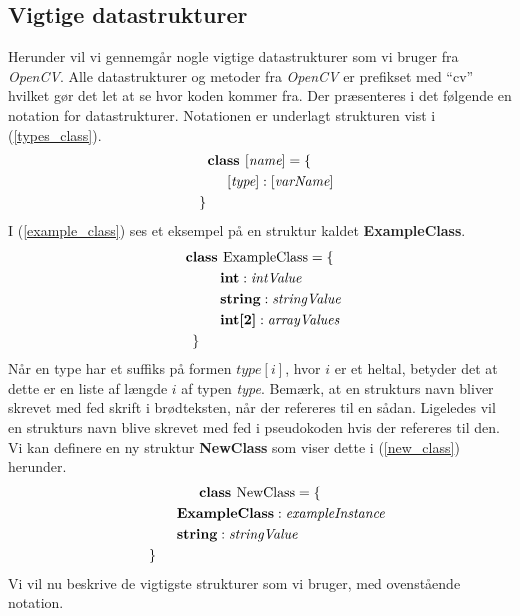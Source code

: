 {\subsection{Vigtige datastrukturer}
Herunder vil vi gennemgår nogle vigtige datastrukturer som vi bruger fra
\emph{OpenCV}.  Alle datastrukturer og metoder fra \emph{OpenCV} er
prefikset med ``cv'' hvilket gør det let at se hvor koden kommer fra.
Der præsenteres i det følgende en notation for datastrukturer.
Notationen er underlagt strukturen vist i (\ref{types_class}).
\begin{multline}
    \textbf{class~} [\textit{name}] = \{ \\
    \shoveleft{\qquad[\textit{type}] : [\textit{varName}]} \\
    \shoveleft{\}}\shoveright{}
    \label{types_class}
\end{multline}
I (\ref{example_class}) ses et eksempel på en struktur kaldet
\textbf{ExampleClass}.
\begin{multline}
    \textbf{class~} \textrm{ExampleClass} = \{ \\
    \shoveleft{\qquad\textbf{int} : \textit{intValue}} \\
    \shoveleft{\qquad\textbf{string} : \textit{stringValue}} \\
    \shoveleft{\qquad\textbf{int[2]} : \textit{arrayValues}} \\
    \shoveleft{\}}\shoveright{}
    \label{example_class}
\end{multline}
Når en type har et suffiks på formen $\textit{type}[i]$, hvor $i$ er et
heltal, betyder det at dette er en liste af længde $i$ af typen
\textit{type}.  Bemærk, at en strukturs navn bliver skrevet med fed
skrift i brødteksten, når der refereres til en sådan. Ligeledes vil en
strukturs navn blive skrevet med fed i pseudokoden hvis der refereres
til den. Vi kan definere en ny struktur \textbf{NewClass} som viser
dette i (\ref{new_class}) herunder.
\begin{multline}
    \textbf{class~} \textrm{NewClass} = \{ \\
    \shoveleft{\qquad\textbf{ExampleClass} : \textit{exampleInstance}} \\
    \shoveleft{\qquad\textbf{string} : \textit{stringValue}} \\
    \shoveleft{\}}\shoveright{}
    \label{new_class}
\end{multline}
Vi vil nu beskrive de vigtigste strukturer som vi bruger, med
ovenstående notation.

}
